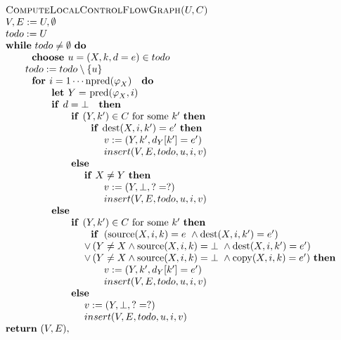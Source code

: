 \begin{equation*}
\begin{tabular}{l}
\textsc{ComputeLocalControlFlowGraph(}$U,C$\textsc{)} \\ 
$V,E:=U,\emptyset $ \\ 
$todo:=U$ \\ 
\textbf{while} $todo\neq \emptyset $ \textbf{do} \\ 
$\qquad \text{\textbf{choose }}u=(X,k,d=e)\in todo$ \\ 
$\qquad todo:=todo\setminus \{u\}$ \\ 
$\qquad \text{\textbf{for }}i=1\cdots \mathrm{npred}(\varphi _{X})\text{ 
\textbf{do}}$ \\ 
$\qquad \qquad \text{\textbf{let }}Y=$ $\mathrm{pred}(\varphi _{X},i)$ \\ 
$\qquad \qquad \text{\textbf{if }}d=\bot $ $\text{\textbf{then}}$ \\ 
$\qquad \qquad \qquad \text{\textbf{if }}(Y,k^{\prime })\in C$ for some $%
k^{\prime }$ \textbf{then} \\ 
$\qquad \qquad \qquad \qquad \text{\textbf{if }}\mathrm{dest}(X,i,k^{\prime
})=e^{\prime }$ \textbf{then} \\ 
$\qquad \qquad \qquad \qquad \qquad v:=(Y,k^{\prime },d_{Y}[k^{\prime
}]=e^{\prime })$ \\ 
$\qquad \qquad \qquad \qquad \qquad insert(V,E,todo,u,i,v)$ \\ 
$\qquad \qquad \qquad \text{\textbf{else}}$ \\ 
$\qquad \qquad \qquad \qquad $\textbf{if} $X\neq Y$ \textbf{then} \\ 
$\qquad \qquad \qquad \qquad \qquad v:=(Y,\bot ,?=?)$ \\ 
$\qquad \qquad \qquad \qquad \qquad insert(V,E,todo,u,i,v)$ \\ 
$\qquad \qquad \text{\textbf{else}}$ \\ 
$\qquad \qquad \qquad \text{\textbf{if }}(Y,k^{\prime })\in C$ for some $%
k^{\prime }$ \textbf{then} \\ 
$\qquad \qquad \qquad \qquad \text{\textbf{if }}\left( \mathrm{source}%
(X,i,k)=e\mathbf{\ }\wedge \mathrm{dest}(X,i,k^{\prime })=e^{\prime }\right) 
$ \\ 
$\qquad \qquad \qquad \qquad \vee \left( Y\neq X\wedge \mathrm{source}%
(X,i,k)=\bot \mathbf{\ }\wedge \mathrm{dest}(X,i,k^{\prime })=e^{\prime
}\right) $ \\ 
$\qquad \qquad \qquad \qquad \vee \left( Y\neq X\wedge \mathrm{source}%
(X,i,k)=\bot \mathbf{\ }\wedge \mathrm{copy}(X,i,k)=e^{\prime }\right) $ 
\textbf{then} \\ 
$\qquad \qquad \qquad \qquad \qquad v:=(Y,k^{\prime },d_{Y}[k^{\prime
}]=e^{\prime })$ \\ 
$\qquad \qquad \qquad \qquad \qquad insert(V,E,todo,u,i,v)\qquad $ \\ 
$\qquad \qquad \qquad \text{\textbf{else}}$ \\ 
$\qquad \qquad \qquad \qquad v:=(Y,\bot ,?=?)$ \\ 
$\qquad \qquad \qquad \qquad insert(V,E,todo,u,i,v)\qquad $ \\ 
\textbf{return} $(V,E),$%
\end{tabular}%
\end{equation*}%
